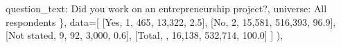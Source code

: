 \documentclass[
  11pt,
  a4paper,
]{article}
\newenvironment{Shaded}{\begin{snugshade}}{\end{snugshade}}
\newcommand{\NormalTok}[1]{\textcolor[rgb]{0.00,0.23,0.31}{#1}}
\newcommand{\OperatorTok}[1]{\textcolor[rgb]{0.37,0.37,0.37}{#1}}
\newcommand{\StringTok}[1]{\textcolor[rgb]{0.13,0.47,0.30}{#1}}
\begin{document}
\begin{Shaded}
\begin{Highlighting}[]
                    \StringTok{\textquotesingle{}question\_text\textquotesingle{}}\NormalTok{: }\StringTok{\textquotesingle{}Did you work on an entrepreneurship project?\textquotesingle{}}\NormalTok{,}
                    \StringTok{\textquotesingle{}universe\textquotesingle{}}\NormalTok{: }\StringTok{\textquotesingle{}All respondents\textquotesingle{}}
\NormalTok{                \},}
\NormalTok{                data}\OperatorTok{=}\NormalTok{[}
\NormalTok{                    [}\StringTok{\textquotesingle{}Yes\textquotesingle{}}\NormalTok{, }\StringTok{\textquotesingle{}1\textquotesingle{}}\NormalTok{, }\StringTok{\textquotesingle{}465\textquotesingle{}}\NormalTok{, }\StringTok{\textquotesingle{}13,322\textquotesingle{}}\NormalTok{, }\StringTok{\textquotesingle{}2.5\textquotesingle{}}\NormalTok{],}
\NormalTok{                    [}\StringTok{\textquotesingle{}No\textquotesingle{}}\NormalTok{, }\StringTok{\textquotesingle{}2\textquotesingle{}}\NormalTok{, }\StringTok{\textquotesingle{}15,581\textquotesingle{}}\NormalTok{, }\StringTok{\textquotesingle{}516,393\textquotesingle{}}\NormalTok{, }\StringTok{\textquotesingle{}96.9\textquotesingle{}}\NormalTok{],}
\NormalTok{                    [}\StringTok{\textquotesingle{}Not stated\textquotesingle{}}\NormalTok{, }\StringTok{\textquotesingle{}9\textquotesingle{}}\NormalTok{, }\StringTok{\textquotesingle{}92\textquotesingle{}}\NormalTok{, }\StringTok{\textquotesingle{}3,000\textquotesingle{}}\NormalTok{, }\StringTok{\textquotesingle{}0.6\textquotesingle{}}\NormalTok{],}
\NormalTok{                    [}\StringTok{\textquotesingle{}Total\textquotesingle{}}\NormalTok{, }\StringTok{\textquotesingle{}\textquotesingle{}}\NormalTok{, }\StringTok{\textquotesingle{}16,138\textquotesingle{}}\NormalTok{, }\StringTok{\textquotesingle{}532,714\textquotesingle{}}\NormalTok{, }\StringTok{\textquotesingle{}100.0\textquotesingle{}}\NormalTok{]}
\NormalTok{                ]}
\NormalTok{            ),}


\end{Highlighting}
\end{Shaded}
\end{document}
